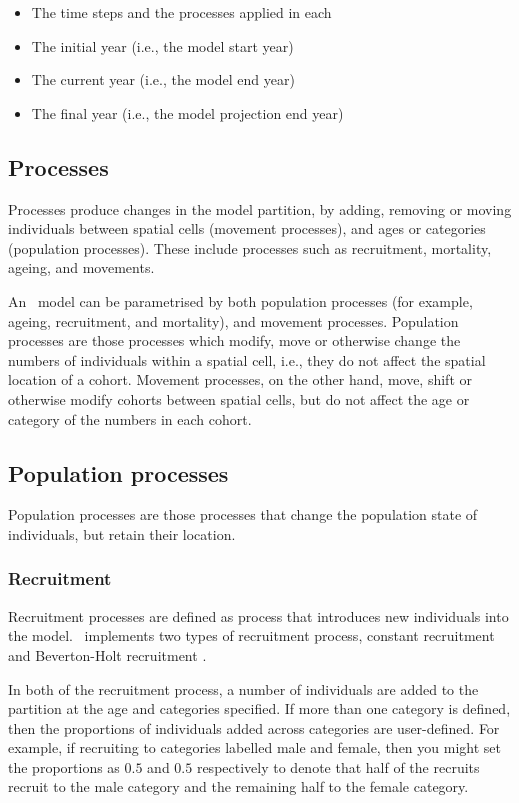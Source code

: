 \begin{itemize}
  \item The time steps and the processes applied in each
  \item The initial year (i.e., the model start year)
  \item The current year (i.e., the model end year)
  \item The final year (i.e., the model projection end year)
\end{itemize}

\subsection{Processes}

Processes produce changes in the model partition, by adding, removing or moving individuals between spatial cells (movement processes), and ages or categories (population processes). These include processes such as recruitment, mortality, ageing, and movements.

An \SPM\ model can be parametrised by both population processes (for example, ageing, recruitment, and mortality), and movement processes. Population processes are those processes which modify, move or otherwise change the numbers of individuals within a spatial cell, i.e., they do not affect the spatial location of a cohort. Movement processes, on the other hand, move, shift or otherwise modify cohorts between spatial cells, but do not affect the age or category of the numbers in each cohort. 

\subsection{Population processes}

Population processes are those processes that change the population state of individuals, but retain their location. 

\subsubsection{Recruitment}

Recruitment processes are defined as  process that introduces new individuals into the model. \SPM\ implements two types of recruitment process, constant recruitment and Beverton-Holt recruitment \citep{1203}. 

In both of the recruitment process, a number of individuals are added to the partition at the age and categories specified. If more than one category is defined, then the proportions of individuals added across categories are user-defined. For example, if recruiting to categories labelled male and female, then you might set the proportions as $0.5$ and $0.5$ respectively to denote that half of the recruits recruit to the male category and the remaining half to the female category.

